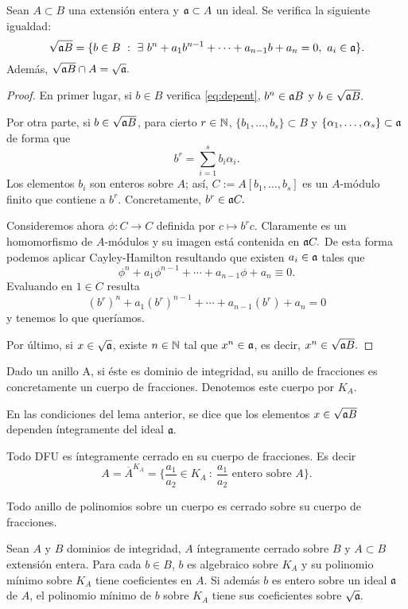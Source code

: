 \documentclass[../main.tex]{subfiles}
\begin{document}
\begin{lemma}
Sean $A\subset B$ una extensión entera y $\mathfrak{a}\subset A$ un ideal. Se verifica la siguiente igualdad:
$$\sqrt{\mathfrak{a} B}=\{b\in B\ :\ \exists\ b^n+a_1 b^{n-1}+\cdots+a_{n-1}b+a_n=0,\ a_i\in\mathfrak{a}\}.$$
Además, $\sqrt{\mathfrak{a} B}\cap A=\sqrt{\mathfrak{a}}.$
\end{lemma}
\begin{proof}
En primer lugar, si $b\in B$ verifica \ref{eq:depent}, $b^n\in\mathfrak{a} B$ y $b\in\sqrt{\mathfrak{a} B}.$

Por otra parte, si $b\in\sqrt{\mathfrak{a} B}$, para cierto $r\in\mathbb{N}$, $\{b_1,\dots,b_s\}\subset B$ y $\{\alpha_1,\dots,\alpha_s\}\subset\mathfrak{a}$ de forma que
$$b^r=\sum_{i=1}^sb_i\alpha_i.$$
Los elementos $b_i$ son enteros sobre $A$; así, $C:=A[b_1,\dots,b_s]$ es un $A$-módulo finito que contiene a $b^r.$ Concretamente, $b^r\in\mathfrak{a} C.$

Consideremos ahora $\phi: C\rightarrow C$ definida por $c\mapsto b^r c.$ Claramente es un homomorfismo de $A$-módulos y su imagen está contenida en $\mathfrak{a} C. $ De esta forma podemos aplicar Cayley-Hamilton resultando que existen $a_i\in\mathfrak{a}$ tales que
$$\phi^n+a_1\phi^{n-1}+\cdots+a_{n-1}\phi+a_n\equiv 0.$$
Evaluando en $1\in C$ resulta
$$(b^r)^n+a_1(b^r)^{n-1}+\cdots+a_{n-1}(b^r)+a_n= 0$$
y tenemos lo que queríamos.

Por último, si $x\in\sqrt{\mathfrak{a}}$, existe $n\in\mathbb{N}$ tal que $x^n\in\mathfrak{a}$, es decir, $x^n\in\sqrt{\mathfrak{a} B}.$
\end{proof}

Dado un anillo A, si éste es dominio de integridad, su anillo de fracciones es concretamente un cuerpo de fracciones. Denotemos este cuerpo por $K_A.$

\begin{definition}
En las condiciones del lema anterior, se dice que los elementos $x\in\sqrt{\mathfrak{a} B}$ dependen íntegramente del ideal $\mathfrak{a}.$
\end{definition}

\begin{lemma}
Todo DFU es íntegramente cerrado en su cuerpo de fracciones. Es decir
$$A=\overline{A}^{K_A}=\{\frac{a_1}{a_2}\in K_A\ :\ \frac{a_1}{a_2}\text{ entero sobre }A\}.$$
\end{lemma}

\begin{remark}
Todo anillo de polinomios sobre un cuerpo es cerrado sobre su cuerpo de fracciones.
\end{remark}

\begin{proposition}
Sean $A$ y $B$ dominios de integridad, $A$ íntegramente cerrado sobre $B$ y $A\subset B$ extensión entera. Para cada $b\in B$, $b$ es algebraico sobre $K_A$ y su polinomio mínimo sobre $K_A$ tiene coeficientes en $A.$ Si además $b$ es entero sobre un ideal $\mathfrak{a}$ de $A$, el polinomio mínimo de $b$ sobre $K_A$ tiene sus coeficientes sobre $\sqrt{\mathfrak{a}}.$
\end{proposition}
\end{document}
